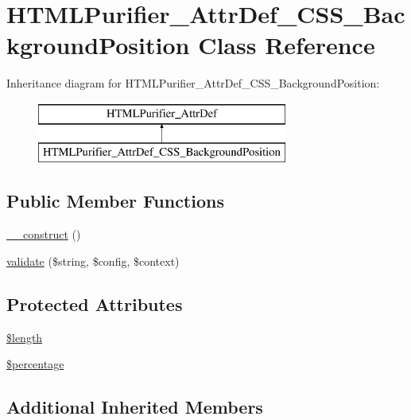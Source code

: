 \hypertarget{classHTMLPurifier__AttrDef__CSS__BackgroundPosition}{\section{H\+T\+M\+L\+Purifier\+\_\+\+Attr\+Def\+\_\+\+C\+S\+S\+\_\+\+Background\+Position Class Reference}
\label{classHTMLPurifier__AttrDef__CSS__BackgroundPosition}
}
Inheritance diagram for H\+T\+M\+L\+Purifier\+\_\+\+Attr\+Def\+\_\+\+C\+S\+S\+\_\+\+Background\+Position\+:\begin{figure}[H]
\begin{center}
\leavevmode
\includegraphics[height=2.000000cm]{classHTMLPurifier__AttrDef__CSS__BackgroundPosition}
\end{center}
\end{figure}
\subsection*{Public Member Functions}
\begin{DoxyCompactItemize}
\item 
\hyperlink{classHTMLPurifier__AttrDef__CSS__BackgroundPosition_a24aa0616368504ddd0357e3692ae7c21}{\+\_\+\+\_\+construct} ()
\item 
\hyperlink{classHTMLPurifier__AttrDef__CSS__BackgroundPosition_a330c8e7bba0fb4f241bdc73b93af21b6}{validate} (\$string, \$config, \$context)
\end{DoxyCompactItemize}
\subsection*{Protected Attributes}
\begin{DoxyCompactItemize}
\item 
\hyperlink{classHTMLPurifier__AttrDef__CSS__BackgroundPosition_ad61228f5654ccd804ec390999c5b6bf5}{\$length}
\item 
\hyperlink{classHTMLPurifier__AttrDef__CSS__BackgroundPosition_af726a396376661d1b536ef8cf3c17150}{\$percentage}
\end{DoxyCompactItemize}
\subsection*{Additional Inherited Members}


